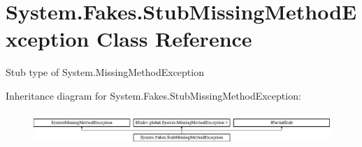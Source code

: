 \hypertarget{class_system_1_1_fakes_1_1_stub_missing_method_exception}{\section{System.\-Fakes.\-Stub\-Missing\-Method\-Exception Class Reference}
\label{class_system_1_1_fakes_1_1_stub_missing_method_exception}
}


Stub type of System.\-Missing\-Method\-Exception 


Inheritance diagram for System.\-Fakes.\-Stub\-Missing\-Method\-Exception\-:\begin{figure}[H]
\begin{center}
\leavevmode
\includegraphics[height=1.269841cm]{class_system_1_1_fakes_1_1_stub_missing_method_exception}
\end{center}
\end{figure}
